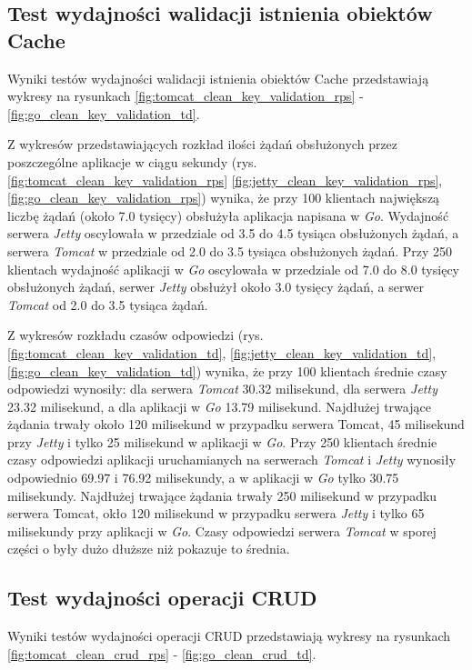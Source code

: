 % 
\clearpage

\subsection{Test wydajności walidacji istnienia obiektów Cache}
Wyniki testów wydajności walidacji istnienia obiektów Cache przedstawiają wykresy na rysunkach \ref{fig:tomcat_clean_key_validation_rps} - \ref{fig:go_clean_key_validation_td}.              

Z wykresów przedstawiających rozkład ilości żądań obsłużonych przez poszczególne aplikacje w ciągu sekundy  (rys. \ref{fig:tomcat_clean_key_validation_rps} \ref{fig:jetty_clean_key_validation_rps}, \ref{fig:go_clean_key_validation_rps}) wynika, że przy 100 klientach największą liczbę żądań (około 7.0 tysięcy) obsłużyła aplikacja napisana w \textsl{Go}. Wydajność serwera \textsl{Jetty} oscylowała w przedziale od 3.5 do 4.5 tysiąca obsłużonych żądań, a serwera \textsl{Tomcat} w przedziale od 2.0 do 3.5 tysiąca obsłużonych żądań. Przy 250 klientach wydajność aplikacji w \textsl{Go} oscylowała w przedziale od 7.0 do 8.0 tysięcy obsłużonych żądań, serwer \textsl{Jetty} obsłużył około 3.0 tysięcy żądań, a serwer \textsl{Tomcat} od 2.0 do 3.5 tysiąca żądań.

Z wykresów rozkładu czasów odpowiedzi (rys. \ref{fig:tomcat_clean_key_validation_td}, \ref{fig:jetty_clean_key_validation_td}, \ref{fig:go_clean_key_validation_td}) wynika, że przy 100 klientach średnie czasy odpowiedzi wynosiły: dla serwera \textsl{Tomcat} 30.32 milisekund, dla serwera \textsl{Jetty} 23.32 milisekund, a dla aplikacji w \textsl{Go} 13.79 milisekund. Najdłużej trwające żądania trwały około 120 milisekund w przypadku serwera Tomcat, 45 milisekund przy \textsl{Jetty} i tylko 25 milisekund w aplikacji w \textsl{Go}. Przy 250 klientach średnie czasy odpowiedzi aplikacji uruchamianych na serwerach \textsl{Tomcat} i \textsl{Jetty} wynosiły odpowiednio 69.97 i 76.92 milisekundy, a w aplikacji w \textsl{Go} tylko 30.75 milisekundy. Najdłużej trwające żądania trwały 250 milisekund w przypadku serwera Tomcat, okło 120 milisekund w przypadku serwera \textsl{Jetty} i tylko 65 milisekundy przy aplikacji w \textsl{Go}. Czasy odpowiedzi serwera \textsl{Tomcat} w sporej części o były dużo dłuższe niż pokazuje to średnia.

% 
\clearpage

\subsection{Test wydajności operacji CRUD}
Wyniki testów wydajności operacji CRUD przedstawiają wykresy na rysunkach \ref{fig:tomcat_clean_crud_rps} - \ref{fig:go_clean_crud_td}.

